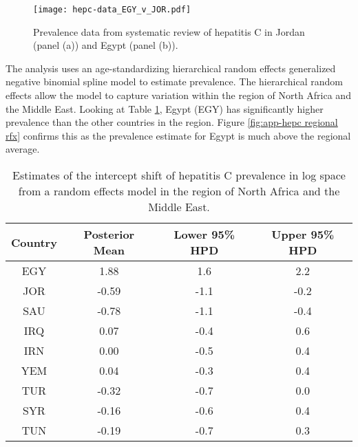     \begin{figure}[h]
        \begin{center}
            \texttt{[image: hepc-data\_EGY\_v\_JOR.pdf]}
            \caption{Prevalence data from systematic review of
              hepatitis C in Jordan (panel (a)) and Egypt (panel
              (b)).}
            \label{fig:app-hepc data}
        \end{center}
    \end{figure}

The analysis uses an age-standardizing hierarchical random effects
generalized negative binomial spline model to estimate prevalence.
The hierarchical random effects allow the model to capture variation
within the region of North Africa and the Middle East.  Looking at
Table \ref{tab:app-hepc regional rfx}, Egypt (EGY) has significantly
higher prevalence than the other countries in the region.  Figure
\ref{fig:app-hepc regional rfx} confirms this as the prevalence
estimate for Egypt is much above the regional average.

    \begin{table}[h]
        \begin{center}
        \caption{ Estimates of the intercept shift of hepatitis C prevalence in log space from a random effects model in the region of North Africa and the Middle East.}
        \label{tab:app-hepc regional rfx}
        \begin{tabular}{|c|c|c|c|}
            \hline
                Country & Posterior Mean & Lower 95\% HPD  & Upper 95\%  HPD \\
            \hline
                EGY	&	1.88	&	 1.6	&	2.2	\\
                JOR	&	-0.59	&	-1.1	&	-0.2 \\
                SAU	&	-0.78	&	-1.1	&	-0.4 \\
                IRQ	&	0.07	&	-0.4	&	0.6	\\
                IRN	&	0.00	&	-0.5	&	0.4	\\
                YEM	&	0.04	&	-0.3	&	0.4	\\
                TUR	&	-0.32	&	-0.7	&	0.0	\\
                SYR	&	-0.16	&	-0.6	&	0.4	\\
                TUN	&	-0.19	&	-0.7	&	0.3	\\
            \hline
        \end{tabular}
        \end{center}
    \end{table}

